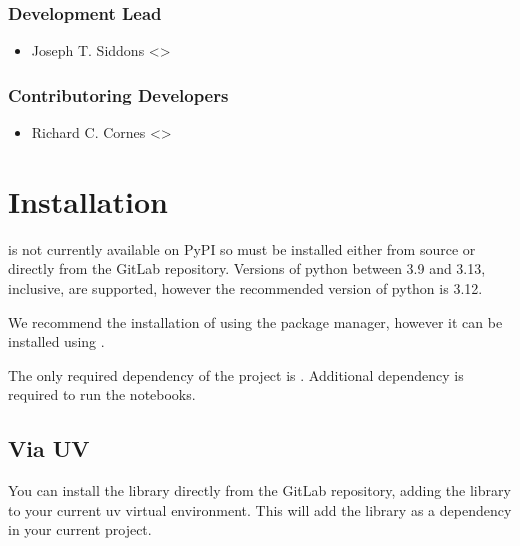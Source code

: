 \documentclass[letterpaper,10pt,english]{sphinxmanual}
\begin{document}
\subsection{Development Lead}
\label{\detokenize{introduction:development-lead}}\begin{itemize}
\item {} 
\sphinxAtStartPar
Joseph T. Siddons \textless{}\textgreater{} 

\end{itemize}


\subsection{Contributoring Developers}
\label{\detokenize{introduction:contributoring-developers}}\begin{itemize}
\item {} 
\sphinxAtStartPar
Richard C. Cornes \textless{}\textgreater{} 

\end{itemize}

\sphinxstepscope


\chapter{Installation}
\label{\detokenize{installation:installation}}\label{\detokenize{installation::doc}}
\sphinxAtStartPar
{} is not currently available on PyPI so must be installed either from source or directly from the
GitLab repository. Versions of python between 3.9 and 3.13, inclusive, are supported, however the recommended version of
python is 3.12.

\sphinxAtStartPar
We recommend the installation of  using the  package manager, however it can be installed using
.

\sphinxAtStartPar
The only required dependency of the project is . Additional dependency  is required to run the 
notebooks.


\section{Via UV}
\label{\detokenize{installation:via-uv}}
\sphinxAtStartPar
You can install the library directly from the GitLab repository, adding the library to your current uv virtual
environment. This will add the library as a dependency in your current project.
\end{document}
